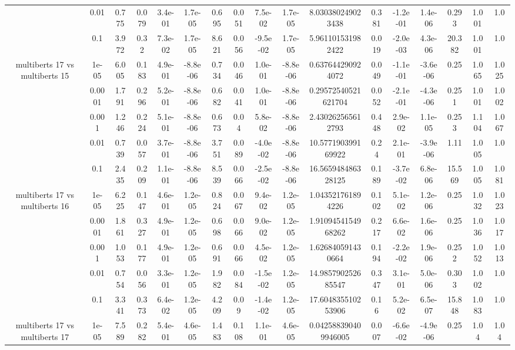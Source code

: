 \begin{tabular}{|c|c|c|c|c|c|c|c|c|c|c|c|c|c|c|c|c|}
 & 0.01 & 0.775 & 0.079 & 3.4e-01 & 1.7e-05 & 0.695 & 0.051 & 7.5e-02 & 1.7e-05 & 8.030380249023438 & 0.381 & -1.2e-01 & 1.4e-06 & 0.293 & 1.001 & 1.0 \\
 & 0.1 & 3.972 & 0.32 & 7.3e-02 & 1.7e-05 & 8.621 & 0.056 & -9.5e-02 & 1.7e-05 & 5.961101531982422 & 0.019 & -2.0e-03 & 4.3e-06 & 20.382 & 1.001 & 1.0 \\
\hline
\multirow{5}{*}{multiberts 17 vs multiberts 15} & 1e-05 & 6.005 & 0.183 & 4.9e-01 & -8.8e-06 & 0.734 & 0.046 & 1.0e-01 & -8.8e-06 & 0.637644290924072 & 0.049 & -1.1e-01 & -3.6e-06 & 0.25 & 1.065 & 1.025 \\
 & 0.0001 & 1.791 & 0.296 & 5.2e-01 & -8.8e-06 & 0.682 & 0.041 & 1.0e-01 & -8.8e-06 & 0.29572540521621704 & 0.052 & -2.1e-01 & -4.3e-06 & 0.251 & 1.001 & 1.002 \\
 & 0.001 & 1.246 & 0.224 & 5.1e-01 & -8.8e-06 & 0.673 & 0.04 & 5.8e-02 & -8.8e-06 & 2.430262565612793 & 0.448 & 2.9e-02 & 1.1e-05 & 0.253 & 1.104 & 1.067 \\
 & 0.01 & 0.739 & 0.057 & 3.7e-01 & -8.8e-06 & 3.751 & 0.089 & -4.0e-02 & -8.8e-06 & 10.577190399169922 & 0.24 & 2.1e-01 & -3.9e-06 & 1.11 & 1.005 & 1.0 \\
 & 0.1 & 2.435 & 0.209 & 1.1e-01 & -8.8e-06 & 8.539 & 0.066 & -2.5e-02 & -8.8e-06 & 16.565948486328125 & 0.189 & -3.7e-02 & 6.8e-06 & 15.569 & 1.005 & 1.081 \\
\hline
\multirow{5}{*}{multiberts 17 vs multiberts 16} & 1e-05 & 6.225 & 0.147 & 4.6e-01 & 1.2e-05 & 0.824 & 0.067 & 9.4e-02 & 1.2e-05 & 1.043521761894226 & 0.102 & 5.1e-02 & 1.2e-06 & 0.25 & 1.032 & 1.023 \\
 & 0.0001 & 1.861 & 0.327 & 4.9e-01 & 1.2e-05 & 0.698 & 0.066 & 9.0e-02 & 1.2e-05 & 1.9109454154968262 & 0.217 & 6.6e-02 & 1.6e-06 & 0.25 & 1.036 & 1.017 \\
 & 0.001 & 1.053 & 0.177 & 4.9e-01 & 1.2e-05 & 0.691 & 0.066 & 4.5e-02 & 1.2e-05 & 1.626840591430664 & 0.194 & -2.2e-02 & 1.9e-06 & 0.252 & 1.052 & 1.013 \\
 & 0.01 & 0.754 & 0.056 & 3.3e-01 & 1.2e-05 & 1.982 & 0.084 & -1.5e-02 & 1.2e-05 & 14.985790252685547 & 0.347 & 3.1e-01 & 5.0e-06 & 0.303 & 1.002 & 1.0 \\
 & 0.1 & 3.341 & 0.373 & 6.4e-02 & 1.2e-05 & 4.209 & 0.09 & -1.4e-02 & 1.2e-05 & 17.604835510253906 & 0.16 & 5.2e-02 & 6.5e-07 & 15.848 & 1.083 & 1.0 \\
\hline
\multirow{5}{*}{multiberts 17 vs multiberts 17} & 1e-05 & 7.589 & 0.282 & 5.4e-01 & 4.6e-05 & 1.483 & 0.108 & 1.1e-01 & 4.6e-05 & 0.042588390409946005 & 0.007 & -6.6e-02 & -4.9e-06 & 0.25 & 1.04 & 1.04 \\

\end{tabular}
